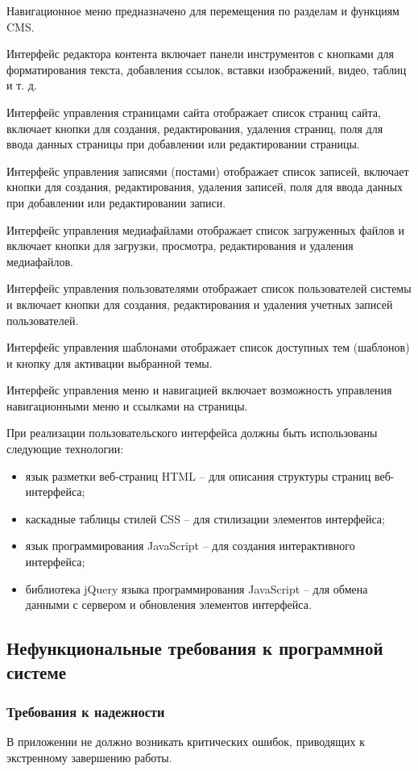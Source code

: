 Навигационное меню предназначено для перемещения по разделам и функциям CMS.

Интерфейс редактора контента включает панели инструментов с кнопками для форматирования текста, добавления ссылок, вставки изображений, видео, таблиц и т. д.

Интерфейс управления страницами сайта отображает список страниц сайта, включает кнопки для создания, редактирования, удаления страниц, поля для ввода данных страницы при добавлении или редактировании страницы.

Интерфейс управления записями (постами) отображает список записей, включает кнопки для создания, редактирования, удаления записей, поля для ввода данных при добавлении или редактировании записи.

Интерфейс управления медиафайлами отображает список загруженных файлов и включает кнопки для загрузки, просмотра, редактирования и удаления медиафайлов.

Интерфейс управления пользователями отображает список пользователей системы и включает кнопки для создания, редактирования и удаления учетных записей пользователей.

Интерфейс управления шаблонами отображает список доступных тем (шаблонов) и кнопку для активации выбранной темы.

Интерфейс управления меню и навигацией включает возможность управления навигационными меню и ссылками на страницы.

При реализации пользовательского интерфейса должны быть использованы следующие технологии:
\begin{itemize}
	\item язык разметки веб-страниц HTML -- для описания структуры страниц веб-интерфейса;
	\item каскадные таблицы стилей СSS -- для стилизации элементов интерфейса;
	\item язык программирования JavaScript -- для создания интерактивного интерфейса;
	\item библиотека jQuery языка программирования JavaScript -- для обмена данными с сервером и обновления элементов интерфейса.
\end{itemize}

\subsection{Нефункциональные требования к программной системе}
\subsubsection{Требования к надежности}
В приложении не должно возникать критических ошибок, приводящих к экстренному завершению работы.

